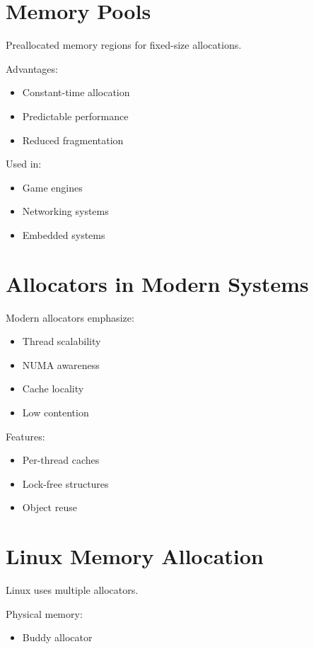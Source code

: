 \section{Memory Pools}

Preallocated memory regions for fixed-size allocations.

Advantages:

\begin{itemize}
\item Constant-time allocation
\item Predictable performance
\item Reduced fragmentation
\end{itemize}

Used in:

\begin{itemize}
\item Game engines
\item Networking systems
\item Embedded systems
\end{itemize}

\section{Allocators in Modern Systems}

Modern allocators emphasize:

\begin{itemize}
\item Thread scalability
\item NUMA awareness
\item Cache locality
\item Low contention
\end{itemize}

Features:

\begin{itemize}
\item Per-thread caches
\item Lock-free structures
\item Object reuse
\end{itemize}

\section{Linux Memory Allocation}

Linux uses multiple allocators.

Physical memory:

\begin{itemize}
\item Buddy allocator
\end{itemize}

